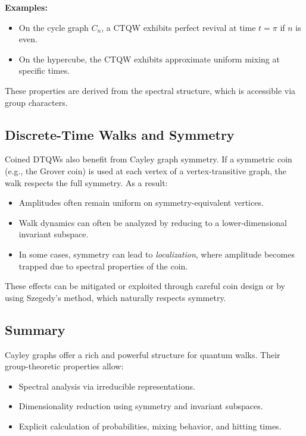 \documentclass[12pt]{report}
\begin{document}
\textbf{Examples:}
\begin{itemize}
    \item On the cycle graph $C_n$, a CTQW exhibits perfect revival at time $t = \pi$ if $n$ is even.
    \item On the hypercube, the CTQW exhibits approximate uniform mixing at specific times.
\end{itemize}

These properties are derived from the spectral structure, which is accessible via group characters.

\subsection{Discrete-Time Walks and Symmetry}

Coined DTQWs also benefit from Cayley graph symmetry. If a symmetric coin (e.g., the Grover coin) is used at each vertex of a vertex-transitive graph, the walk respects the full symmetry. As a result:
\begin{itemize}
    \item Amplitudes often remain uniform on symmetry-equivalent vertices.
    \item Walk dynamics can often be analyzed by reducing to a lower-dimensional invariant subspace.
    \item In some cases, symmetry can lead to \emph{localization}, where amplitude becomes trapped due to spectral properties of the coin.
\end{itemize}

These effects can be mitigated or exploited through careful coin design or by using Szegedy's method, which naturally respects symmetry.

\subsection{Summary}

Cayley graphs offer a rich and powerful structure for quantum walks. Their group-theoretic properties allow:
\begin{itemize}
    \item Spectral analysis via irreducible representations.
    \item Dimensionality reduction using symmetry and invariant subspaces.
    \item Explicit calculation of probabilities, mixing behavior, and hitting times.
\end{itemize}
\end{document}
